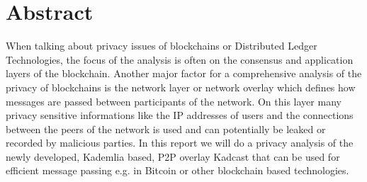 \section{Abstract}
When talking about privacy issues of blockchains or Distributed Ledger Technologies, the
focus of the analysis is often on the consensus and application layers of the blockchain.
Another major factor for a comprehensive analysis of the privacy of blockchains is
the network layer or network overlay which defines how messages are passed between participants of the network.
On this layer many privacy sensitive informations like the IP addresses of users and the connections between the peers
of the network is used and can potentially be leaked or recorded by malicious parties.
In this report we will do a privacy analysis of the newly developed, Kademlia based,
P2P overlay Kadcast that can be used for efficient message passing e.g. in Bitcoin or other blockchain based technologies.